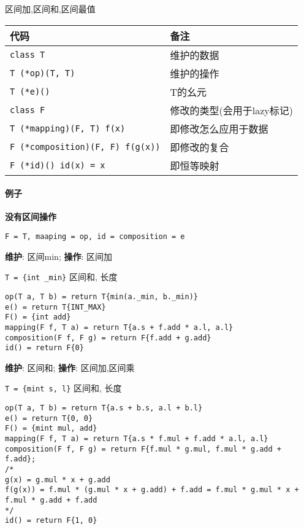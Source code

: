 区间加,区间和,区间最值

\begin{tabular}{ll}
    \hline
    代码                                  & 备注                       \\
    \hline
    \verb|class T|                        & 维护的数据                 \\
    \verb|T (*op)(T, T)|                  & 维护的操作                 \\
    \verb|T (*e)()|                       & T的幺元                    \\
    \verb|class F|                        & 修改的类型(会用于lazy标记) \\
    \verb|T (*mapping)(F, T) f(x)|        & 即修改怎么应用于数据       \\
    \verb|F (*composition)(F, F) f(g(x))| & 即修改的复合               \\
    \verb|F (*id)() id(x) = x|            & 即恒等映射                 \\
    \hline
\end{tabular}

\paragraph{例子}

\textbf{没有区间操作}

\verb|F = T, maaping = op, id = composition = e|

\textbf{维护}: 区间min; \textbf{操作}: 区间加

\verb|T = {int _min}| 区间和, 长度

\begin{verbatim}
op(T a, T b) = return T{min(a._min, b._min)}
e() = return T{INT_MAX}
F() = {int add}
mapping(F f, T a) = return T{a.s + f.add * a.l, a.l}
composition(F f, F g) = return F{f.add + g.add}
id() = return F{0}
\end{verbatim}

\textbf{维护}: 区间和; \textbf{操作}: 区间加,区间乘

\verb|T = {mint s, l}| 区间和, 长度

\begin{verbatim}
op(T a, T b) = return T{a.s + b.s, a.l + b.l}
e() = return T{0, 0}
F() = {mint mul, add}
mapping(F f, T a) = return T{a.s * f.mul + f.add * a.l, a.l}
composition(F f, F g) = return F{f.mul * g.mul, f.mul * g.add + f.add};
/*
g(x) = g.mul * x + g.add
f(g(x)) = f.mul * (g.mul * x + g.add) + f.add = f.mul * g.mul * x + f.mul * g.add + f.add
*/
id() = return F{1, 0}
\end{verbatim}
